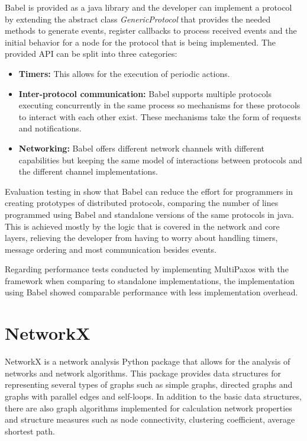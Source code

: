 Babel is provided as a java library and the developer can implement a protocol
by extending the abstract class \textit{GenericProtocol} that provides the needed
methods to generate events, register callbacks to process received events and 
the initial behavior for a node for the protocol that is being implemented.
The provided API can be split into three categories:

\begin{itemize}
  \item \textbf{Timers:} This allows for the execution of periodic actions.
  \item \textbf{Inter-protocol communication:} Babel supports multiple protocols
executing concurrently in the same process so mechanisms for these protocols
to interact with each other exist. These mechanisms take the form of requests and
notifications.
  \item \textbf{Networking:} Babel offers different network channels with different
capabilities but keeping the same model of interactions between protocols and the
different channel implementations.
\end{itemize}

Evaluation testing in \cite{babel} show that Babel can reduce the effort for programmers
in creating prototypes of distributed protocols, comparing the number of lines programmed
using Babel and standalone versions of the same protocols in java. This is achieved
mostly by the logic that is covered in the network and core layers, relieving the developer
from having to worry about handling timers, message ordering and most communication besides events.

Regarding performance tests conducted by implementing MultiPaxos \cite{paxos} with the framework
when comparing to standalone implementations, the implementation using Babel showed comparable performance
with less implementation overhead.

\section{NetworkX}
\label{sec:networkx}

NetworkX \cite{networkx} is a network analysis Python package that allows for the analysis of
networks and network algorithms. This package provides data structures for representing
several types of graphs such as simple graphs, directed graphs and graphs with parallel
edges and self-loops. In addition to the basic data structures, there are also
graph algorithms implemented for calculation network properties and structure measures
such as node connectivity, clustering coefficient, average shortest path.

